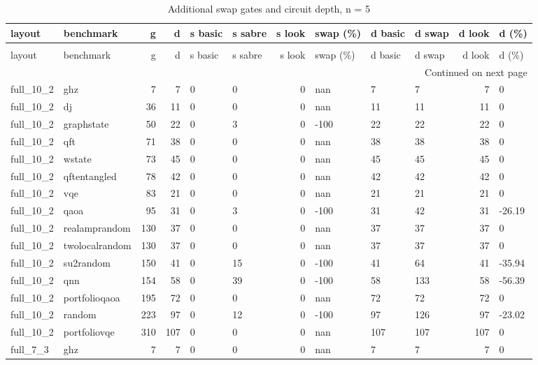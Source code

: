 \begin{longtable}{llrrllrlllrl}
\caption{Additional swap gates and circuit depth, n = 5} \label{benchmark-table-5} \\
\toprule
layout & benchmark & g & d & s basic & s sabre & s look & swap (\%) & d basic & d swap & d look & d (\%) \\
\midrule
\endfirsthead
\caption[]{Additional swap gates and circuit depth, n = 5} \\
\toprule
layout & benchmark & g & d & s basic & s sabre & s look & swap (\%) & d basic & d swap & d look & d (\%) \\
\midrule
\endhead
\midrule
\multicolumn{12}{r}{Continued on next page} \\
\midrule
\endfoot
\bottomrule
\endlastfoot
full\_10\_2 & ghz & 7 & 7 & 0 & 0 & 0 & nan & 7 & 7 & 7 & 0 \\
full\_10\_2 & dj & 36 & 11 & 0 & 0 & 0 & nan & 11 & 11 & 11 & 0 \\
full\_10\_2 & graphstate & 50 & 22 & 0 & 3 & 0 & -100 & 22 & 22 & 22 & 0 \\
full\_10\_2 & qft & 71 & 38 & 0 & 0 & 0 & nan & 38 & 38 & 38 & 0 \\
full\_10\_2 & wstate & 73 & 45 & 0 & 0 & 0 & nan & 45 & 45 & 45 & 0 \\
full\_10\_2 & qftentangled & 78 & 42 & 0 & 0 & 0 & nan & 42 & 42 & 42 & 0 \\
full\_10\_2 & vqe & 83 & 21 & 0 & 0 & 0 & nan & 21 & 21 & 21 & 0 \\
full\_10\_2 & qaoa & 95 & 31 & 0 & 3 & 0 & -100 & 31 & 42 & 31 & -26.19 \\
full\_10\_2 & realamprandom & 130 & 37 & 0 & 0 & 0 & nan & 37 & 37 & 37 & 0 \\
full\_10\_2 & twolocalrandom & 130 & 37 & 0 & 0 & 0 & nan & 37 & 37 & 37 & 0 \\
full\_10\_2 & su2random & 150 & 41 & 0 & 15 & 0 & -100 & 41 & 64 & 41 & -35.94 \\
full\_10\_2 & qnn & 154 & 58 & 0 & 39 & 0 & -100 & 58 & 133 & 58 & -56.39 \\
full\_10\_2 & portfolioqaoa & 195 & 72 & 0 & 0 & 0 & nan & 72 & 72 & 72 & 0 \\
full\_10\_2 & random & 223 & 97 & 0 & 12 & 0 & -100 & 97 & 126 & 97 & -23.02 \\
full\_10\_2 & portfoliovqe & 310 & 107 & 0 & 0 & 0 & nan & 107 & 107 & 107 & 0 \\
full\_7\_3 & ghz & 7 & 7 & 0 & 0 & 0 & nan & 7 & 7 & 7 & 0 \\

\end{longtable}
